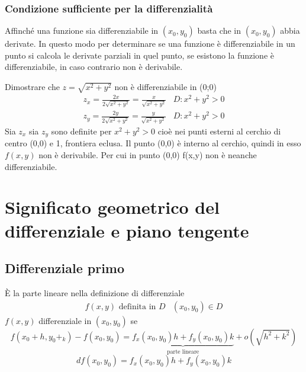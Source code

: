 \subsubsection{Condizione sufficiente per la differenzialità}
\begin{defi}
  Affinché una funzione sia differenziabile in $(x_0,y_0)$ basta che in $(x_0,y_0)$ abbia derivate.
  In questo modo per determinare se una funzione è differenziabile in un punto si calcola le
  derivate parziali in quel punto, se esistono la funzione è differenziabile, in caso contrario
  non è derivabile.
\end{defi}
\begin{esempio}
  Dimostrare che $z=\sqrt{x^2+y^2}$ non è differenziabile in (0;0)
  \begin{equation*}
    \begin{matrix}
      z_x=\frac{2x}{2\sqrt{x^2+y^2}} = \frac{x}{\sqrt{x^2+y^2}} & D: x^2+y^2>0 \\
      z_y=\frac{2y}{2\sqrt{x^2+y^2}} = \frac{y}{\sqrt{x^2+y^2}} & D: x^2+y^2>0
    \end{matrix}
  \end{equation*}
  Sia $z_x$ sia $z_y$ sono definite per $x^2+y^2>0$ cioè nei punti esterni al cerchio di centro (0,0)
  e 1, frontiera eclusa. Il punto (0,0) è interno al cerchio, quindi in esso $f(x,y)$ non è derivabile. Per cui in punto (0,0) f(x,y) non è neanche differenziabile.
\end{esempio}
\section{Significato geometrico del differenziale e piano tengente}
\subsection{Differenziale primo}
È la parte lineare nella definizione di differenziale
\begin{equation*}
  \begin{matrix}
    f(x,y) \text{ definita in } D & (x_0,y_0)\in D
  \end{matrix}
\end{equation*}
$f(x,y)$ differenziale in $(x_0,y_0)$ se
\begin{equation*}
  f(x_0+h,y_0+_k)-f(x_0,y_0)=\underbrace{f_x(x_0,y_0)h+f_y(x_0,y_0)k}_{\text{parte lineare}}
  +o(\sqrt{h^2+k^2})
\end{equation*}
\begin{equation*}
  df(x_0,y_0)=f_x(x_0,y_0)h+f_y(x_0,y_0)k
\end{equation*}
